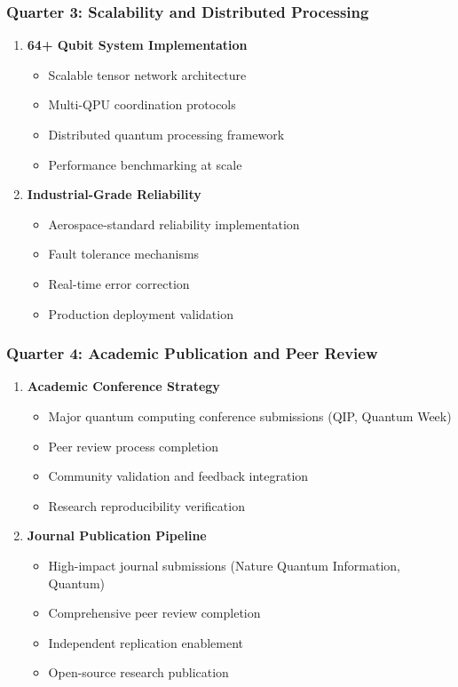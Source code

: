 \documentclass[12pt,a4paper]{article}
\begin{document}
\subsubsection{Quarter 3: Scalability and Distributed Processing}
\begin{enumerate}
    \item \textbf{64+ Qubit System Implementation}
    \begin{itemize}
        \item Scalable tensor network architecture
        \item Multi-QPU coordination protocols
        \item Distributed quantum processing framework
        \item Performance benchmarking at scale
    \end{itemize}
    
    \item \textbf{Industrial-Grade Reliability}
    \begin{itemize}
        \item Aerospace-standard reliability implementation
        \item Fault tolerance mechanisms
        \item Real-time error correction
        \item Production deployment validation
    \end{itemize}
\end{enumerate}

\subsubsection{Quarter 4: Academic Publication and Peer Review}
\begin{enumerate}
    \item \textbf{Academic Conference Strategy}
    \begin{itemize}
        \item Major quantum computing conference submissions (QIP, Quantum Week)
        \item Peer review process completion
        \item Community validation and feedback integration
        \item Research reproducibility verification
    \end{itemize}
    
    \item \textbf{Journal Publication Pipeline}
    \begin{itemize}
        \item High-impact journal submissions (Nature Quantum Information, Quantum)
        \item Comprehensive peer review completion
        \item Independent replication enablement
        \item Open-source research publication
    \end{itemize}
\end{enumerate}
\end{document}
